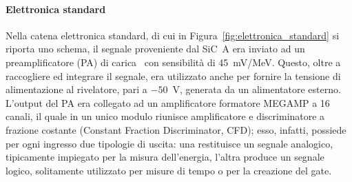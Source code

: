


\paragraph{Elettronica standard} 
Nella catena elettronica standard, di cui in Figura~\ref{fig:elettronica_standard} si riporta uno schema, il segnale proveniente dal SiC~A era inviato ad un preamplificatore (PA) di carica~\cite{boiano:ieee08} con sensibilità di 45~mV/MeV.
Questo, oltre a raccogliere ed integrare il segnale, era utilizzato anche per fornire la tensione di alimentazione al rivelatore, pari a $-50$~V, generata da un alimentatore esterno.
L'output del PA era collegato ad un amplificatore formatore MEGAMP a 16 canali, il quale in un unico modulo riunisce amplificatore e discriminatore a frazione costante (Constant Fraction Discriminator, CFD); esso, infatti, possiede per ogni ingresso due tipologie di uscita: una restituisce un segnale analogico, tipicamente impiegato per la misura dell'energia, l'altra produce un segnale logico, solitamente utilizzato per misure di tempo o per la creazione del gate.
%
%
